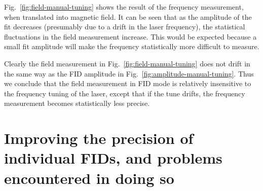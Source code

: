 Fig.~\ref{fig:field-manual-tuning} shows the result of the frequency
measurement, when translated into magnetic field.  It can be seen that
as the amplitude of the fit decreases (presumably due to a drift in
the laser frequency), the statistical fluctuations in the field
measurement increase.  This would be expected because a small fit
amplitude will make the frequency statistically more difficult to
measure.

Clearly the field measurement in Fig.~\ref{fig:field-manual-tuning}
does not drift in the same way as the FID amplitude in
Fig.~\ref{fig:amplitude-manual-tuning}.  Thus we conclude that the
field measurement in FID mode is relatively insensitive to the
frequency tuning of the laser, except that if the tune drifts, the
frequency measurement becomes statistically less precise.





\section{Improving the precision of individual FIDs, and problems encountered in doing so\label{sec:reference-frequency}}

